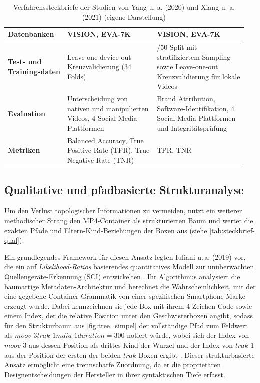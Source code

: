\begin{table}[H]
\begin{tabular}{>{\raggedright\arraybackslash}p{0.15\linewidth}>{\raggedright\arraybackslash}p{0.4\linewidth}>{\raggedright\arraybackslash}p{0.4\linewidth}}
         \textbf{Datenbanken}&  VISION, EVA-7K&VISION, EVA-7K\\\midrule
         \textbf{Test- und Trainingsdaten}&  Leave-one-device-out Kreuzvalidierung (34 Folds)&50/50 Split mit stratifiziertem Sampling sowie Leave-one-out Kreuzvalidierung für lokale Videos\\\midrule
         \textbf{Evaluation}& Unterscheidung von nativen und manipulierten Videos, 4 Social-Media-Plattformen&Brand Attribution, Software-Identifikation, 4 Social-Media-Plattformen und Integritätsprüfung\\\midrule
         \textbf{Metriken}& Balanced Accuracy, True Positive Rate (TPR), True Negative Rate (TNR)&TPR, TNR\\ \bottomrule
    \end{tabular}
    \caption{Verfahrenssteckbriefe der Studien von Yang u. a. (2020) \cite{yang_efficient_2020} und Xiang u. a. (2021) \cite{xiang_forensic_2021} (eigene Darstellung)}
    \label{tab:steckbrief-quan}
\end{table}


\subsection{Qualitative und pfadbasierte Strukturanalyse}

Um den Verlust topologischer Informationen zu vermeiden, nutzt ein weiterer methodischer Strang den MP4-Container als strukturierten Baum und wertet die exakten Pfade und Eltern-Kind-Beziehungen der Boxen aus (siehe \cref{tab:steckbrief-qual}). 

Ein grundlegendes Framework für diesen Ansatz legten Iuliani u.\,a. (2019) vor, die ein auf \textit{Likelihood-Ratios} basierendes quantitatives Modell zur unüberwachten Quellengeräte-Erkennung (SCI) entwickelten \cite{iuliani_video_2019}. Ihr Algorithmus analysiert die baumartige Metadaten-Architektur und berechnet die Wahrscheinlichkeit, mit der eine gegebene Container-Grammatik von einer spezifischen Smartphone-Marke erzeugt wurde. Dabei kennzeichnen sie jede Box mit ihrem 4-Zeichen-Code sowie einem Index, der die relative Position unter den Geschwisterboxen angibt, sodass für den Strukturbaum aus \cref{fig:tree_simpel} der vollständige Pfad zum Feldwert als \textbf{\(moov\text{-}3trak\text{-}1mdia\text{-}1duration{=}300\)} notiert würde, wobei sich der Index von \(moov\text{-}3\) aus dessen Position als drittes Kind der Wurzel und der Index von \(trak\text{-}1\) aus der Position der ersten der beiden \(trak\)-Boxen ergibt \cite[Kap. III]{iuliani_video_2019}. Dieser strukturbasierte Ansatz ermöglicht eine trennscharfe Zuordnung, da er die proprietären Designentscheidungen der Hersteller in ihrer syntaktischen Tiefe erfasst.


